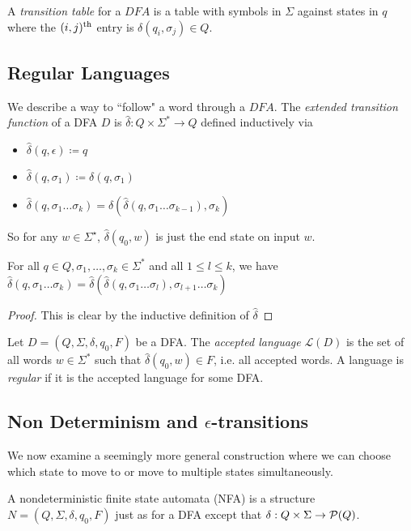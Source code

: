 \documentclass[10pt,a4paper]{article}
\begin{document}
A \emph{transition table} for a $DFA$ is a table with symbols in $\Sigma$ against states in $q$ where the $(i,j)\textsuperscript{th}$ entry is $\delta(q_i, \sigma_j) \in Q$.

\subsection*{Regular Languages}
We describe a way to ``follow" a word through a $DFA$. The \emph{extended transition function} of a DFA $D$ is $\hat{\delta} : Q \times \Sigma^\ast \to Q$ defined inductively via 
\begin{itemize}
\item $\hat{\delta}(q, \epsilon) \coloneqq q$
\item $\hat{\delta}(q, \sigma_1) \coloneqq \delta(q, \sigma_1)$
\item $\hat{\delta}(q, \sigma_1\ldots\sigma_k) = \delta(\hat{\delta}(q, \sigma_1\ldots\sigma_{k-1}), \sigma_k)$
\end{itemize}
So for any $w \in \Sigma^\star$, $\hat{\delta}(q_0, w)$ is just the end state on input $w$.

\begin{lemma}
For all $q \in Q, \sigma_1, \ldots, \sigma_k \in \Sigma^\ast$ and all $1 \leq l \leq k$, we have $\hat{\delta}(q, \sigma_1\ldots\sigma_k) = \hat{\delta}(\hat{\delta}(q, \sigma_1\ldots\sigma_l), \sigma_{l+1}\ldots\sigma_k)$
\end{lemma}
\begin{proof}
This is clear by the inductive definition of $\hat{\delta}$
\end{proof}

Let $D = (Q, \Sigma, \delta, q_0, F)$ be a DFA. The \emph{accepted language} $\mathcal{L}(D)$ is the set of all words $w \in \Sigma^\ast$ such that $\hat{\delta}(q_0, w) \in F$, i.e. all accepted words. A language is \emph{regular} if it is the accepted language for some DFA.

\subsection*{Non Determinism and $\epsilon$-transitions}
We now examine a seemingly more general construction where we can choose which state to move to or move to multiple states simultaneously.

A nondeterministic finite state automata (NFA) is a structure $N=(Q, \Sigma, \delta, q_0, F)$ just as for a DFA except that $\delta:Q \times \Sigma \to \mathcal{P}(Q)$.
\end{document}

